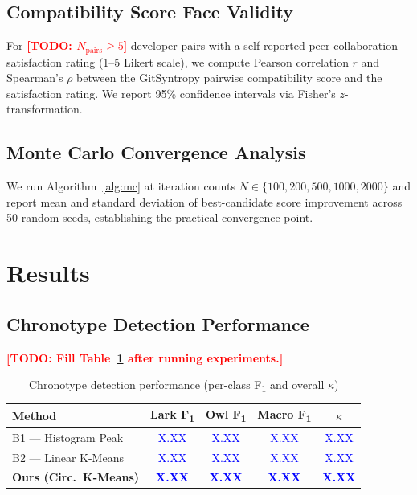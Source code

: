 \documentclass[conference]{IEEEtran}
\newcommand{\TODO}[1]{\textcolor{red}{\textbf{[TODO: #1]}}}
\newcommand{\RESULT}[1]{\textcolor{blue}{#1}}   %
\begin{document}
\subsection{Compatibility Score Face Validity}

For \TODO{$N_{\mathrm{pairs}} \geq 5$} developer pairs with a
self-reported peer collaboration satisfaction rating (1–5 Likert
scale), we compute Pearson correlation $r$ and Spearman's $\rho$
between the GitSyntropy pairwise compatibility score and the
satisfaction rating.
We report 95\% confidence intervals via Fisher's $z$-transformation.

\subsection{Monte Carlo Convergence Analysis}

We run Algorithm~\ref{alg:mc} at iteration counts
$N \in \{100, 200, 500, 1000, 2000\}$ and report mean and standard
deviation of best-candidate score improvement across 50 random seeds,
establishing the practical convergence point.

\section{Results}
\label{sec:results}

\subsection{Chronotype Detection Performance}

\TODO{Fill Table~\ref{tab:chrono_results} after running experiments.}

\begin{table}[t]
  \caption{Chronotype detection performance (per-class
    F\textsubscript{1} and overall $\kappa$)}
  \label{tab:chrono_results}
  \centering
  \renewcommand{\arraystretch}{1.15}
  \begin{tabular}{@{}lcccc@{}}
    \toprule
    \textbf{Method} & \textbf{Lark F\textsubscript{1}} &
    \textbf{Owl F\textsubscript{1}} &
    \textbf{Macro F\textsubscript{1}} &
    \textbf{$\kappa$} \\
    \midrule
    B1 — Histogram Peak  & \RESULT{X.XX} & \RESULT{X.XX}
                         & \RESULT{X.XX} & \RESULT{X.XX} \\
    B2 — Linear K-Means  & \RESULT{X.XX} & \RESULT{X.XX}
                         & \RESULT{X.XX} & \RESULT{X.XX} \\
    \textbf{Ours (Circ.\ K-Means)} & \RESULT{\textbf{X.XX}}
                                    & \RESULT{\textbf{X.XX}}
                                    & \RESULT{\textbf{X.XX}}
                                    & \RESULT{\textbf{X.XX}} \\
    \bottomrule
  \end{tabular}
\end{table}
\end{document}
